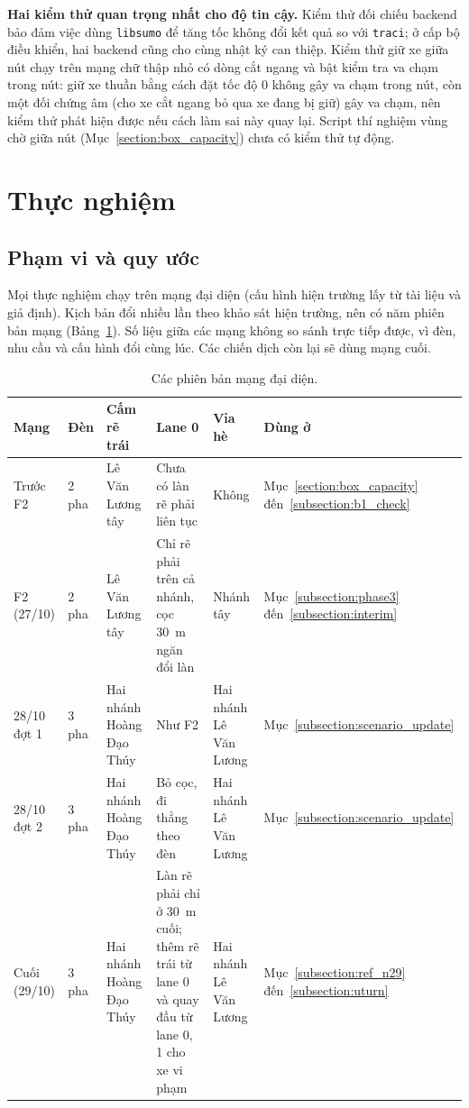 \documentclass[../DoAn.tex]{subfiles}
\begin{document}
\textbf{Hai kiểm thử quan trọng nhất cho độ tin cậy.} Kiểm thử đối chiếu backend bảo đảm việc dùng \texttt{libsumo} để tăng tốc không đổi kết quả so với \texttt{traci}; ở cấp bộ điều khiển, hai backend cũng cho cùng nhật ký can thiệp. Kiểm thử giữ xe giữa nút chạy trên mạng chữ thập nhỏ có dòng cắt ngang và bật kiểm tra va chạm trong nút: giữ xe thuần bằng cách đặt tốc độ 0 không gây va chạm trong nút, còn một đối chứng âm (cho xe cắt ngang bỏ qua xe đang bị giữ) gây va chạm, nên kiểm thử phát hiện được nếu cách làm sai này quay lại. Script thí nghiệm vùng chờ giữa nút (Mục~\ref{section:box_capacity}) chưa có kiểm thử tự động.

\section{Thực nghiệm}
\label{section:experiments}

\subsection{Phạm vi và quy ước}
\label{subsection:net_versions}

Mọi thực nghiệm chạy trên mạng đại diện (cấu hình hiện trường lấy từ tài liệu và giả định). Kịch bản đổi nhiều lần theo khảo sát hiện trường, nên có năm phiên bản mạng (Bảng~\ref{table:4.nets}). Số liệu giữa các mạng không so sánh trực tiếp được, vì đèn, nhu cầu và cấu hình đổi cùng lúc. Các chiến dịch còn lại sẽ dùng mạng cuối.

\begin{table}[H]
\centering
\small\setlength{\tabcolsep}{3pt}
\caption{Các phiên bản mạng đại diện.}
\label{table:4.nets}
\begin{tabular}{|p{2.0cm}|p{0.9cm}|p{2.3cm}|p{4.0cm}|p{2.2cm}|p{2.3cm}|}
\hline
\textbf{Mạng} & \textbf{Đèn} & \textbf{Cấm rẽ trái} & \textbf{Lane 0} & \textbf{Vỉa hè} & \textbf{Dùng ở} \\ \hline
Trước F2 & 2 pha & Lê Văn Lương tây & Chưa có làn rẽ phải liên tục & Không & Mục~\ref{section:box_capacity} đến~\ref{subsection:b1_check} \\ \hline
F2 (27/10) & 2 pha & Lê Văn Lương tây & Chỉ rẽ phải trên cả nhánh, cọc 30~m ngăn đổi làn & Nhánh tây & Mục~\ref{subsection:phase3} đến~\ref{subsection:interim} \\ \hline
28/10 đợt 1 & 3 pha & Hai nhánh Hoàng Đạo Thúy & Như F2 & Hai nhánh Lê Văn Lương & Mục~\ref{subsection:scenario_update} \\ \hline
28/10 đợt 2 & 3 pha & Hai nhánh Hoàng Đạo Thúy & Bỏ cọc, đi thẳng theo đèn & Hai nhánh Lê Văn Lương & Mục~\ref{subsection:scenario_update} \\ \hline
Cuối (29/10) & 3 pha & Hai nhánh Hoàng Đạo Thúy & Làn rẽ phải chỉ ở 30~m cuối; thêm rẽ trái từ lane 0 và quay đầu từ lane 0, 1 cho xe vi phạm & Hai nhánh Lê Văn Lương & Mục~\ref{subsection:ref_n29} đến~\ref{subsection:uturn} \\ \hline
\end{tabular}
\end{table}
\end{document}

